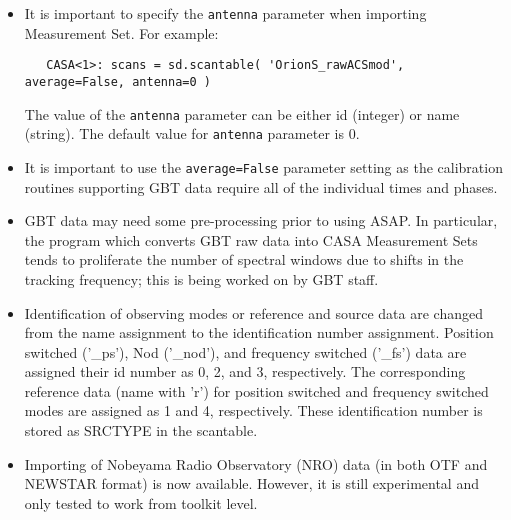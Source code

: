 \begin{itemize}

\item It is important to specify the {\tt antenna} parameter when importing Measurement Set.
 For example:

\begin{verbatim}
   CASA<1>: scans = sd.scantable( 'OrionS_rawACSmod', average=False, antenna=0 )
\end{verbatim}
 
 The value of the {\tt antenna} parameter can be either id (integer) or name
 (string). The default value for {\tt antenna} parameter is 0.

\item It is important to use the {\tt average=False} parameter
setting as the calibration routines supporting GBT data require all of
the individual times and phases.

\item GBT data may need some pre-processing prior to using
ASAP. In particular, the program which converts GBT raw data into CASA
Measurement Sets tends to proliferate the number of spectral windows
due to shifts in the tracking frequency; this is being worked on by
GBT staff. 

%
\item  Identification of observing modes or reference and source data are
 changed from the name assignment to the identification number
 assignment. Position switched ('\_ps'), Nod ('\_nod'), and  frequency
 switched ('\_fs') data are assigned their id number as 0, 2, and 3,
 respectively. The corresponding reference data (name with 'r') for position
 switched and frequency switched modes are assigned as 1 and 4,
 respectively. These identification number is stored as SRCTYPE in
 the scantable.

\item  Importing of Nobeyama Radio Observatory (NRO) data (in both OTF and NEWSTAR format)
 is now available. However, it is still experimental and only tested to work from toolkit level.
\end{itemize}

